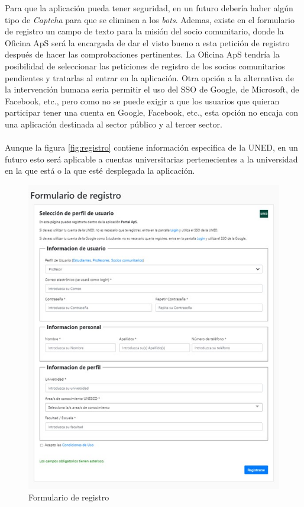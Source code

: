 \documentclass[11pt]{book}
\begin{document}
	Para que la aplicación pueda tener seguridad, en un futuro debería haber algún tipo de \emph{Captcha} para que se eliminen a los \emph{bots}. Ademas, existe en el formulario de registro un campo de texto para la misión del socio comunitario, donde la Oficina ApS será la encargada de dar el visto bueno a esta petición de registro después de hacer las comprobaciones pertinentes. La Oficina ApS tendría la posibilidad de seleccionar las peticiones de registro de los socios comunitarios pendientes y tratarlas al entrar en la aplicación. Otra opción a la alternativa de la intervención humana seria permitir el uso del SSO de Google, de Microsoft, de Facebook, etc., pero como no se puede exigir a que los usuarios que quieran participar tener una cuenta en Google, Facebook, etc., esta opción no encaja con una aplicación destinada al sector público y al tercer sector. \\\\
	Aunque la figura \ref{fig:registro} contiene información especifica de la UNED, en un futuro esto será aplicable a cuentas universitarias pertenecientes a la universidad en la que está o la que esté desplegada la aplicación.
	\begin{figure}[t]
		\centering
		\includegraphics[scale=0.7]{registro}
		\caption{Formulario de registro}
	\end{figure}
\end{document}
